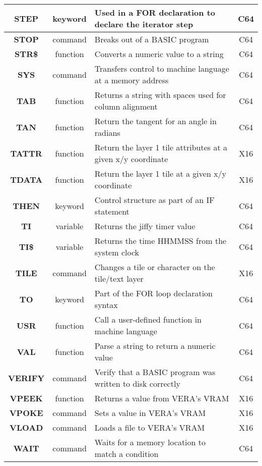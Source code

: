 \begin{longtable}{|c|c|m{4cm}|c|}
	{\bfseries STEP} & keyword & Used in a {\ttfamily FOR} declaration to declare the iterator step & C64 \\ \hline
	{\bfseries STOP} & command & Breaks out of a BASIC program & C64 \\ \hline
	{\bfseries STR\$} & function & Converts a numeric value to a string & C64 \\ \hline
	{\bfseries SYS} & command & Transfers control to machine language at a memory address & C64 \\ \hline
	{\bfseries TAB} & function & Returns a string with spaces used for column alignment & C64 \\ \hline
	{\bfseries TAN} & function & Return the tangent for an angle in radians & C64 \\ \hline
	{\bfseries TATTR} & function & Return the layer 1 tile attributes at a given x/y coordinate & X16 \\ \hline
	{\bfseries TDATA} & function & Return the layer 1 tile at a given x/y coordinate & X16 \\ \hline
	{\bfseries THEN} & keyword & Control structure as part of an {\ttfamily IF} statement & C64 \\ \hline
	{\bfseries TI} & variable & Returns the jiffy timer value & C64 \\ \hline
	{\bfseries TI\$} & variable & Returns the time HHMMSS from the system clock & C64 \\ \hline
	{\bfseries TILE} & command & Changes a tile or character on the tile/text layer & X16 \\ \hline
	{\bfseries TO} & keyword & Part of the {\ttfamily FOR} loop declaration syntax & C64 \\ \hline
	{\bfseries USR} & function & Call a user-defined function in machine language & C64 \\ \hline
	{\bfseries VAL} & function & Parse a string to return a numeric value & C64 \\ \hline
	{\bfseries VERIFY} & command & Verify that a BASIC program was written to disk correctly & C64 \\ \hline
	{\bfseries VPEEK} & function & Returns a value from VERA's VRAM & X16 \\ \hline
	{\bfseries VPOKE} & command & Sets a value in VERA's VRAM & X16 \\ \hline
	{\bfseries VLOAD} & command & Loads a file to VERA's VRAM & X16 \\ \hline
	{\bfseries WAIT} & command & Waits for a memory location to match a condition & C64 \\ \hline
\end{longtable}
